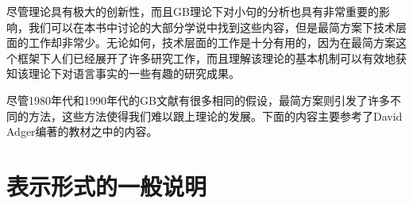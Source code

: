 尽管\xbarc 理论具有极大的创新性，而且GB理论下对小句的分析也具有非常重要的影响，我们可以在本书中讨论的大部分学说中找到这些内容，但是最简方案下技术层面的工作却非常少。无论如何，技术层面的工作是十分有用的，因为在最简方案这个框架下人们已经展开了许多研究工作，而且理解该理论的基本机制可以有效地获知该理论下对语言事实的一些有趣的研究成果。


尽管1980年代和1990年代的GB文献有很多相同的假设，最简方案则引发了许多不同的方法，这些方法使得我们难以跟上理论的发展。下面的内容主要参考了David Adger编著的教材之中的内容\citep{Adger2003a}。

\section{表示形式的一般说明}

